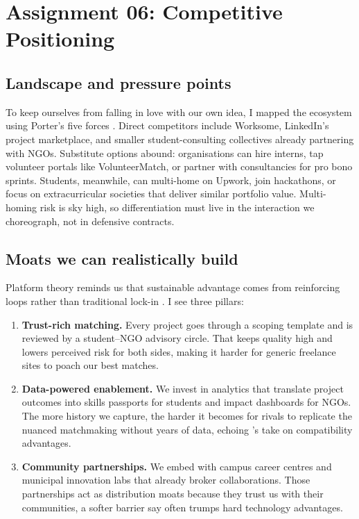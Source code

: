 \section*{Assignment 06: Competitive Positioning}

\subsection*{Landscape and pressure points}
To keep ourselves from falling in love with our own idea, I mapped the ecosystem using Porter’s five forces \citep{Porter2008}. Direct competitors include Worksome, LinkedIn’s project marketplace, and smaller student-consulting collectives already partnering with NGOs. Substitute options abound: organisations can hire interns, tap volunteer portals like VolunteerMatch, or partner with consultancies for pro bono sprints. Students, meanwhile, can multi-home on Upwork, join hackathons, or focus on extracurricular societies that deliver similar portfolio value. Multi-homing risk is sky high, so differentiation must live in the interaction we choreograph, not in defensive contracts.

\subsection*{Moats we can realistically build}
Platform theory reminds us that sustainable advantage comes from reinforcing loops rather than traditional lock-in \citep{Choudary2016,Reillier2017}. I see three pillars:
\begin{enumerate}
  \item \textbf{Trust-rich matching.} Every project goes through a scoping template and is reviewed by a student--NGO advisory circle. That keeps quality high and lowers perceived risk for both sides, making it harder for generic freelance sites to poach our best matches.
  \item \textbf{Data-powered enablement.} We invest in analytics that translate project outcomes into skills passports for students and impact dashboards for NGOs. The more history we capture, the harder it becomes for rivals to replicate the nuanced matchmaking without years of data, echoing \citet{FarrellSaloner1986}'s take on compatibility advantages.
  \item \textbf{Community partnerships.} We embed with campus career centres and municipal innovation labs that already broker collaborations. Those partnerships act as distribution moats because they trust us with their communities, a softer barrier \citet{ShapiroVarian1999} say often trumps hard technology advantages.
\end{enumerate}

